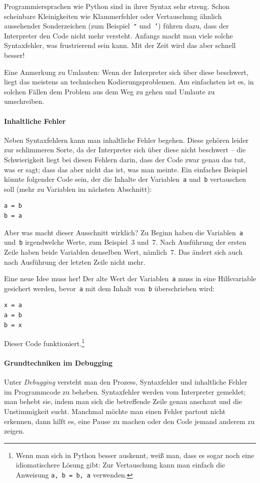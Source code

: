 \documentclass{blatt}
\begin{document}
Programmiersprachen wie Python sind in ihrer Syntax sehr streng. Schon
scheinbare Kleinigkeiten wie Klammerfehler oder Vertauschung ähnlich
aussehender Sonderzeichen (zum Beispiel~\texttt{"} und~\texttt{'}) führen
dazu, dass der Interpreter den Code nicht mehr versteht. Anfangs macht man
viele solche Syntaxfehler, was frustrierend sein kann. Mit der Zeit wird das
aber schnell besser!

Eine Anmerkung zu Umlauten: Wenn der Interpreter sich über diese beschwert,
liegt das meistens an technischen Kodierungsproblemen. Am einfachsten ist es,
in solchen Fällen dem Problem aus dem Weg zu gehen und Umlaute zu umschreiben.

\paragraph{Inhaltliche Fehler} Neben Syntaxfehlern kann man inhaltliche Fehler
begehen. Diese gehören leider zur schlimmeren Sorte, da der Interpreter sich
über diese nicht beschwert -- die Schwierigkeit liegt bei diesen Fehlern darin,
dass der Code zwar genau das tut, was er sagt; dass das aber nicht das ist, was
man meinte. Ein einfaches Beispiel könnte folgender Code sein, der die Inhalte
der Variablen~\texttt{a} und~\texttt{b} vertauschen soll (mehr zu Variablen im
nächsten Abschnitt):
\begin{verbatim}
a = b
b = a
\end{verbatim}
Aber was macht dieser Ausschnitt wirklich? Zu Beginn haben die
Variablen~\texttt{a} und~\texttt{b} irgendwelche Werte, zum Beispiel~3 und~7.
Nach Ausführung der ersten Zeile haben beide Variablen denselben Wert,
nämlich~7.  Das ändert sich auch nach Ausführung der letzten Zeile nicht mehr.

Eine neue Idee muss her! Der alte Wert der Variablen~\texttt{a} muss in eine
Hilfsvariable gesichert werden, bevor~\texttt{a} mit dem Inhalt von~\texttt{b}
überschrieben wird:
\begin{verbatim}
x = a
a = b
b = x
\end{verbatim}
Dieser Code funktioniert.\footnote{Wenn man sich in Python besser auskennt,
weiß man, dass es sogar noch eine idiomatischere Lösung gibt: Zur Vertauschung
kann man einfach die Anweisung \texttt{a, b = b, a} verwenden.}


\paragraph{Grundtechniken im Debugging} Unter \emph{Debugging} versteht man den
Prozess, Syntaxfehler und inhaltliche Fehler im Programmcode zu beheben.
Syntaxfehler werden vom Interpreter gemeldet; man behebt sie, indem man sich
die betreffende Zeile genau anschaut und die Unstimmigkeit sucht. Manchmal
möchte man einen Fehler partout nicht erkennen, dann hilft es, eine Pause zu
machen oder den Code jemand anderem zu zeigen.
\end{document}
